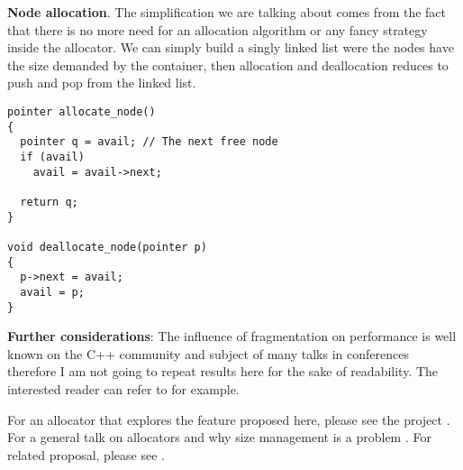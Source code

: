 \documentclass[11pt]{article}
\begin{document}
%
%

\noindent
{\bf Node allocation}.  The simplification we are talking about comes from the
fact that there is no more need for an allocation algorithm or any fancy
strategy inside the allocator. We can simply build a singly linked list were
the nodes have the size demanded by the container, then allocation and
deallocation reduces to push and pop from the linked list.

\medskip
\begin{lstlisting}
pointer allocate_node()
{
  pointer q = avail; // The next free node
  if (avail)
    avail = avail->next;

  return q;
}

void deallocate_node(pointer p)
{
  p->next = avail;
  avail = p;
}

\end{lstlisting}

\medskip
\noindent
{\bf Further considerations}: The influence of fragmentation on
performance is well known on the C++ community and subject of many
talks in conferences therefore I am not going to repeat results here
for the sake of readability. The interested reader can refer to
\cite{chandler, meyers} for example.

For an allocator that explores the feature proposed here, please see
the project \cite{rtcpp}. For a general
talk on allocators and why size management is a problem
\cite{alexandrescu}. For related proposal, please see \cite{prop1}.

\end{document}
